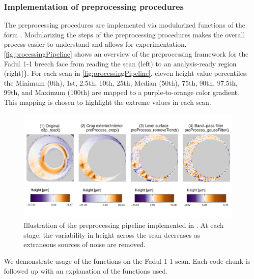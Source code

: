 \hypertarget{implementation-of-preprocessing-procedures}{%
\subsubsection{Implementation of preprocessing
procedures}\label{implementation-of-preprocessing-procedures}}

The preprocessing procedures are implemented via modularized functions
of the form . Modularizing the steps of the
preprocessing procedures makes the overall process easier to understand
and allows for experimentation. \autoref{fig:processingPipeline} shows
an overview of the preprocessing framework for the Fadul 1-1 breech face
from reading the scan (left) to an analysis-ready region (right)\}. For
each scan in \autoref{fig:processingPipeline}, eleven height value
percentiles: the Minimum (0th), 1st, 2.5th, 10th, 25th, Median (50th),
75th, 90th, 97.5th, 99th, and Maximum (100th) are mapped to a
purple-to-orange color gradient. This mapping is chosen to highlight the
extreme values in each scan.

\begin{Schunk}
\begin{figure}[htbp]

{\centering \includegraphics[width=\textwidth]{figures/cmcr-unnamed-chunk-5-1} 

}

\caption{\label{fig:processingPipeline} Illustration of the  preprocessing pipeline implemented in .  At each stage, the variability in height across the scan decreases as extraneous sources of noise are removed.}\label{fig:unnamed-chunk-5}
\end{figure}
\end{Schunk}

We demonstrate usage of the  functions on the Fadul
1-1 scan. Each code chunk is followed up with an explanation of the
functions used.

